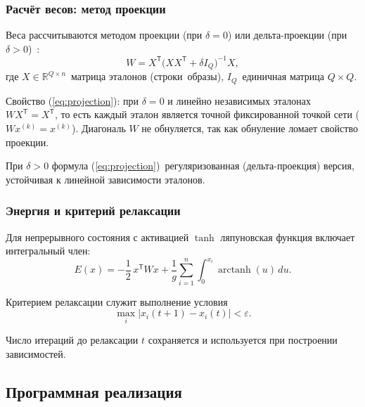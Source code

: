 \subsubsection{Расчёт весов: метод проекции}

Веса рассчитываются методом проекции (при $\delta = 0$) или дельта-проекции (при $\delta > 0$)~\cite{method}:
\begin{equation}
	W = X^{\mathsf{T}} \bigl( X X^{\mathsf{T}} + \delta I_Q \bigr)^{-1} X,
	\label{eq:projection}
\end{equation}
где $X \in \mathbb{R}^{Q \times n}$~\mdash  матрица эталонов (строки~\mdash  образы), $I_Q$~\mdash  единичная матрица $Q \times Q$.

Свойство (\ref{eq:projection}): при $\delta = 0$ и линейно независимых эталонах $W X^{\mathsf{T}} = X^{\mathsf{T}}$, то есть каждый эталон является точной фиксированной точкой сети ($W x^{(k)} = x^{(k)}$). Диагональ $W$ не обнуляется, так как обнуление ломает свойство проекции.

При $\delta > 0$ формула (\ref{eq:projection})~\mdash  регуляризованная (дельта-проекция) версия, устойчивая к линейной зависимости эталонов.

\subsubsection{Энергия и критерий релаксации}

Для непрерывного состояния с активацией $\tanh$ ляпуновская функция включает интегральный член:
\begin{equation}
	E(x) = -\frac{1}{2}\, x^{\mathsf{T}} W x + \frac{1}{g} \sum_{i=1}^{n} \int_{0}^{x_i} \operatorname{arctanh}(u)\, du.
\end{equation}

Критерием релаксации служит выполнение условия
\begin{equation}
	\max_i |x_i(t+1) - x_i(t)| < \varepsilon.
\end{equation}

Число итераций до релаксации $t$ сохраняется и используется при построении зависимостей.

\subsection{Программная реализация}

